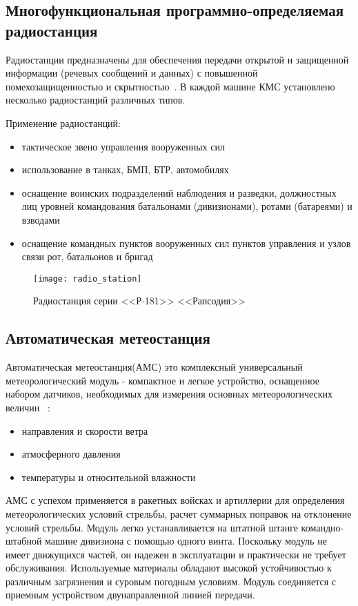 \subsection{Многофункциональная программно-определяемая радиостанция}
\label{sub:lit_review:radio}

Радиостанции предназначены для обеспечения передачи открытой и защищенной информации (речевых сообщений и данных) с
повышенной помехозащищенностью и скрытностью~\cite{prc9661}.
В каждой машине КМС установлено несколько радиостанций различных типов.

Применение радиостанций:
\begin{itemize}
	\item тактическое звено управления вооруженных сил
	\item использование в танках, БМП, БТР, автомобилях
	\item оснащение воинских подразделений наблюдения и разведки, должностных лиц уровней командования батальонами (дивизионами), ротами (батареями) и взводами
	\item оснащение командных пунктов вооруженных сил пунктов управления и узлов связи рот, батальонов и бригад
\end{itemize}

\begin{figure}[ht]
	\centering
	\texttt{[image: radio\_station]}
	\caption{Радиостанция серии <<Р-181>> <<Рапсодия>>~\cite{prc9661}}
	\label{fig:lit_reiview:meteo:radio_station}
\end{figure}

\subsection{Автоматическая метеостанция}
\label{sub:lit_review:meteo}

Автоматическая метеостанция(АМС) это комплексный универсальный метеорологический модуль - компактное и легкое
устройство, оснащенное набором датчиков, необходимых для измерения основных метеорологических величин ~\cite{wxt530}:
\begin{itemize}
	\item направления и скорости ветра
	\item атмосферного давления
	\item температуры и относительной влажности
\end{itemize}

АМС с успехом применяется в ракетных войсках и артиллерии для определения метеорологических условий стрельбы, расчет суммарных поправок на отклонение условий стрельбы.
Модуль легко устанавливается на штатной штанге командно-штабной машине дивизиона с помощью одного винта.
Поскольку модуль не имеет движущихся частей, он надежен в эксплуатации и практически не требует обслуживания.
Используемые материалы обладают высокой устойчивостью к различным загрязнения и суровым погодным условиям.
Модуль соединяется с приемным устройством двунаправленной линией передачи.

